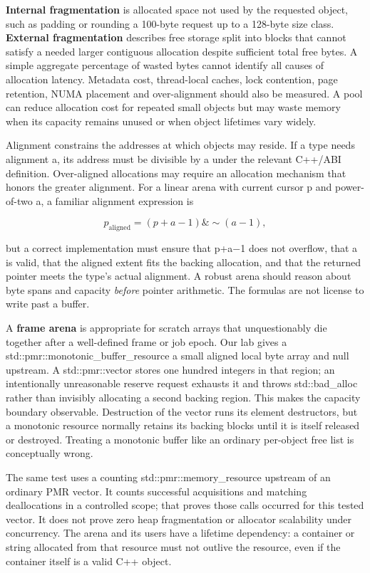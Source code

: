 \textbf{Internal fragmentation} is allocated space not used by the requested object, such as padding or rounding a 100-byte request up to a 128-byte size class. \textbf{External fragmentation} describes free storage split into blocks that cannot satisfy a needed larger contiguous allocation despite sufficient total free bytes. A simple aggregate percentage of wasted bytes cannot identify all causes of allocation latency. Metadata cost, thread-local caches, lock contention, page retention, NUMA placement and over-alignment should also be measured. A pool can reduce allocation cost for repeated small objects but may waste memory when its capacity remains unused or when object lifetimes vary widely.

Alignment constrains the addresses at which objects may reside. If a type needs alignment a, its address must be divisible by a under the relevant C++/ABI definition. Over-aligned allocations may require an allocation mechanism that honors the greater alignment. For a linear arena with current cursor p and power-of-two a, a familiar alignment expression is

\[
p_{\mathrm{aligned}}=(p+a-1)\mathbin{\&}\sim(a-1),
\]

but a correct implementation must ensure that p+a−1 does not overflow, that a is valid, that the aligned extent fits the backing allocation, and that the returned pointer meets the type's actual alignment. A robust arena should reason about byte spans and capacity \emph{before} pointer arithmetic. The formulas are not license to write past a buffer.

A \textbf{frame arena} is appropriate for scratch arrays that unquestionably die together after a well-defined frame or job epoch. Our lab gives a std::pmr::monotonic\_buffer\_resource a small aligned local byte array and null upstream. A std::pmr::vector stores one hundred integers in that region; an intentionally unreasonable reserve request exhausts it and throws std::bad\_alloc rather than invisibly allocating a second backing region. This makes the capacity boundary observable. Destruction of the vector runs its element destructors, but a monotonic resource normally retains its backing blocks until it is itself released or destroyed. Treating a monotonic buffer like an ordinary per-object free list is conceptually wrong.

The same test uses a counting std::pmr::memory\_resource upstream of an ordinary PMR vector. It counts successful acquisitions and matching deallocations in a controlled scope; that proves those calls occurred for this tested vector. It does not prove zero heap fragmentation or allocator scalability under concurrency. The arena and its users have a lifetime dependency: a container or string allocated from that resource must not outlive the resource, even if the container itself is a valid C++ object.

